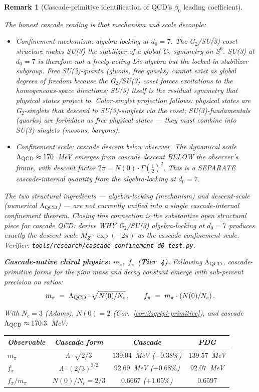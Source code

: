 \documentclass[12pt,a4paper]{article}
\newtheorem*{remark}{Remark}
\begin{document}
\begin{remark}[Cascade-primitive identification of QCD's $\beta_0$ leading coefficient]
\begin{itemize}[nosep]
The honest cascade reading is that mechanism and scale decouple:
\begin{itemize}[nosep]
\item \emph{Confinement mechanism: algebra-locking at $d_0 = 7$.}
The G$_2$/SU(3) coset structure makes SU(3) the stabilizer of a
global G$_2$ symmetry on $S^6$. SU(3) at $d_0 = 7$ is therefore
not a freely-acting Lie algebra but the locked-in stabilizer
subgroup. Free SU(3)-quanta (gluons, free quarks) cannot exist
as global degrees of freedom because the G$_2$/SU(3) coset
forces excitations to the homogeneous-space directions; SU(3)
itself is the residual symmetry that physical states project to.
Color-singlet projection follows: physical states are
G$_2$-singlets that descend to SU(3)-singlets via the coset;
SU(3)-fundamentals (quarks) are forbidden as free physical states
--- they must combine into SU(3)-singlets (mesons, baryons).
\item \emph{Confinement scale: cascade descent below observer.}
The dynamical scale $\Lambda_{\rm QCD} \approx 170$~MeV emerges
from cascade descent BELOW the observer's frame, with descent
factor $2\pi = N(0)\cdot\Gamma(\tfrac{1}{2})^2$. This is a
SEPARATE cascade-internal quantity from the algebra-locking at
$d_0 = 7$.
\end{itemize}

The two structural ingredients --- algebra-locking (mechanism) and
descent-scale (numerical $\Lambda_{\rm QCD}$) --- are not currently
unified into a single cascade-internal confinement theorem. Closing
this connection is the substantive open structural piece for cascade
QCD: derive WHY G$_2$/SU(3) algebra-locking at $d_0 = 7$ produces
exactly the descent scale $M_Z\cdot\exp(-2\pi)$ as the cascade
confinement scale. Verifier:
\texttt{tools/research/cascade\_confinement\_d0\_test.py}.
\end{itemize}

\medskip\noindent\textbf{Cascade-native chiral physics: $m_\pi$, $f_\pi$ (Tier~4).}
Following $\Lambda_{\rm QCD}$, cascade-primitive forms for the pion
mass and decay constant emerge with sub-percent precision on ratios:
\[
m_\pi \;=\; \Lambda_{\rm QCD}\cdot\sqrt{N(0)/N_c}\,, \qquad
f_\pi \;=\; m_\pi\cdot(N(0)/N_c)\,.
\]

With $N_c = 3$ (Adams), $N(0) = 2$ (Cor.~\ref{cor:2sqrtpi-primitive}),
and cascade $\Lambda_{\rm QCD} \approx 170.3$~MeV:
\begin{center}
\renewcommand{\arraystretch}{1.15}
\begin{tabular}{lccc}
\toprule
Observable & Cascade form & Cascade & PDG \\
\midrule
$m_\pi$       & $\Lambda\cdot\sqrt{2/3}$       & $139.04$~MeV ($-0.38\%$) & $139.57$~MeV \\
$f_\pi$       & $\Lambda\cdot(2/3)^{3/2}$      & $92.69$~MeV  ($+0.68\%$) & $92.07$~MeV  \\
$f_\pi/m_\pi$ & $N(0)/N_c = 2/3$               & $0.6667$ ($+1.05\%$)     & $0.6597$     \\
\bottomrule
\end{tabular}
\end{center}


\end{remark}
\end{document}
